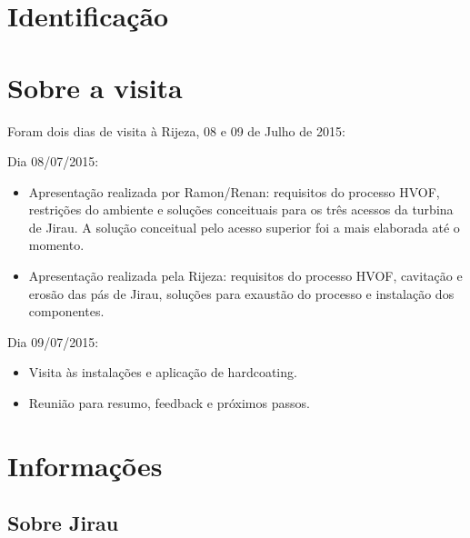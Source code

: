\documentclass[12pt,a4paper]{article}
\begin{document}



\newpage%
\section{Identificação}



\newpage%
\section{Sobre a visita}
Foram dois dias de visita à Rijeza, 08 e 09 de Julho de 2015:

Dia 08/07/2015:
\begin{itemize}
  \item Apresentação realizada por Ramon/Renan: requisitos do processo HVOF,
  restrições do ambiente e soluções conceituais para os três acessos da turbina de
  Jirau. A solução conceitual pelo acesso superior foi a mais elaborada até
  o momento.
  \item Apresentação realizada pela Rijeza: requisitos do processo HVOF,
  cavitação e erosão das pás de Jirau, soluções para exaustão do processo e
  instalação dos componentes.
\end{itemize}

Dia 09/07/2015:
\begin{itemize}
  \item Visita às instalações e aplicação de hardcoating.
  \item Reunião para resumo, feedback e próximos passos.
\end{itemize}

\section{Informações}

\subsection{Sobre Jirau}
\end{document}
